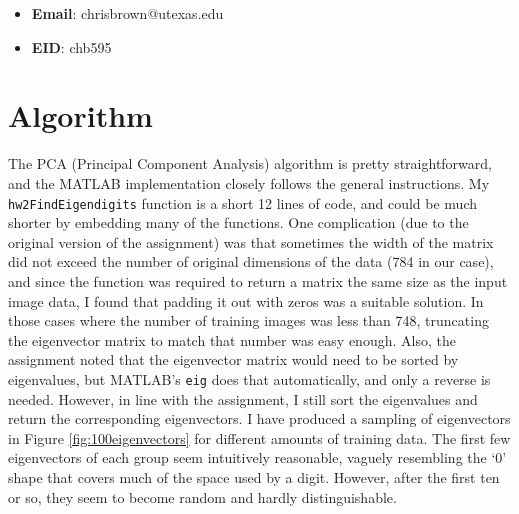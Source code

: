 \documentclass[11pt]{report}
\begin{document}
\begin{itemize}
  \item \textbf{Email}: chrisbrown@utexas.edu
  \item \textbf{EID}: chb595
\end{itemize}

\section{Algorithm}

The PCA (Principal Component Analysis) algorithm is pretty straightforward, and the MATLAB implementation closely follows the general instructions. My \texttt{hw2FindEigendigits} function is a short 12 lines of code, and could be much shorter by embedding many of the functions. One complication (due to the original version of the assignment) was that sometimes the width of the matrix did not exceed the number of original dimensions of the data (784 in our case), and since the function was required to return a matrix the same size as the input image data, I found that padding it out with zeros was a suitable solution. In those cases where the number of training images was less than 748, truncating the eigenvector matrix to match that number was easy enough. Also, the assignment noted that the eigenvector matrix would need to be sorted by eigenvalues, but MATLAB's \texttt{eig} does that automatically, and only a reverse is needed. However, in line with the assignment, I still sort the eigenvalues and return the corresponding eigenvectors. I have produced a sampling of eigenvectors in Figure \ref{fig:100eigenvectors} for different amounts of training data. The first few eigenvectors of each group seem intuitively reasonable, vaguely resembling the `0' shape that covers much of the space used by a digit. However, after the first ten or so, they seem to become random and hardly distinguishable.
\end{document}
